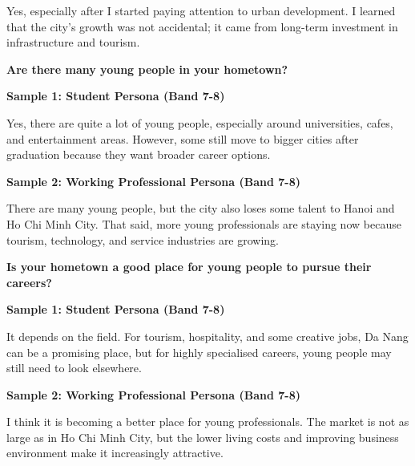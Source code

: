 Yes, especially after I started paying attention to urban development. I learned that the city's growth was not accidental; it came from long-term investment in infrastructure and tourism.

\separator

\begin{ieltsquestion}
\textbf{Are there many young people in your hometown?}
\end{ieltsquestion}
\textbf{Sample 1: Student Persona (Band 7-8)}

Yes, there are quite a lot of young people, especially around universities, cafes, and entertainment areas. However, some still move to bigger cities after graduation because they want broader career options.

\textbf{Sample 2: Working Professional Persona (Band 7-8)}

There are many young people, but the city also loses some talent to Hanoi and Ho Chi Minh City. That said, more young professionals are staying now because tourism, technology, and service industries are growing.

\separator

\begin{ieltsquestion}
\textbf{Is your hometown a good place for young people to pursue their careers?}
\end{ieltsquestion}
\textbf{Sample 1: Student Persona (Band 7-8)}

It depends on the field. For tourism, hospitality, and some creative jobs, Da Nang can be a promising place, but for highly specialised careers, young people may still need to look elsewhere.

\textbf{Sample 2: Working Professional Persona (Band 7-8)}

I think it is becoming a better place for young professionals. The market is not as large as in Ho Chi Minh City, but the lower living costs and improving business environment make it increasingly attractive.

\separator


